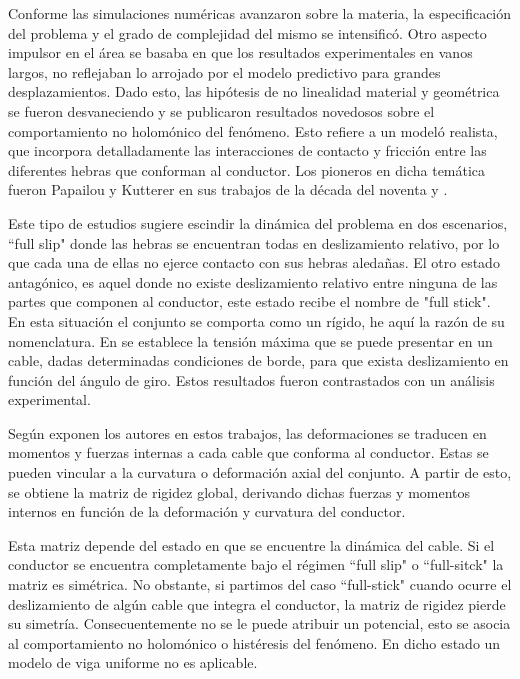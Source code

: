 Conforme las simulaciones numéricas avanzaron sobre la materia, la especificación del problema y el grado de complejidad del mismo se intensificó. Otro aspecto impulsor en el área se basaba en que los resultados experimentales en vanos largos, no reflejaban lo arrojado por el modelo predictivo para grandes desplazamientos. Dado esto, las hipótesis de no linealidad material y geométrica se fueron desvaneciendo y se publicaron resultados novedosos sobre el comportamiento no holomónico del fenómeno. Esto refiere a un modeló realista, que incorpora detalladamente las interacciones de contacto y fricción entre las diferentes hebras que conforman al conductor. Los pioneros en dicha temática fueron Papailou y Kutterer  en sus trabajos de la década del noventa \cite {Papailiou1997}  y \cite{Kutterer1992}.

Este tipo de estudios sugiere escindir la dinámica del problema en dos escenarios, ``full slip" donde las hebras se encuentran todas en deslizamiento relativo, por lo que cada una de ellas no ejerce contacto con sus hebras aledañas. El otro estado antagónico, es aquel donde no existe deslizamiento relativo entre ninguna de las partes que componen al conductor, este estado recibe el nombre de "full stick". En esta situación el conjunto se comporta como un rígido, he aquí la razón de su nomenclatura. En \cite {Papailiou1997} se establece la tensión máxima que se puede presentar en un cable, dadas determinadas condiciones de borde, para que exista deslizamiento en función del ángulo de giro. Estos resultados fueron contrastados con un análisis experimental. 


Según exponen los autores en estos trabajos, las deformaciones se traducen en momentos y fuerzas internas a cada cable que conforma al conductor. Estas se pueden vincular a la curvatura o deformación axial del conjunto. A partir de esto, se obtiene la matriz de rigidez global, derivando dichas fuerzas y momentos internos en función de la deformación y curvatura del conductor.

Esta matriz depende del estado en que se encuentre la dinámica del cable. Si el conductor se encuentra completamente bajo el régimen ``full slip" o ``full-sitck" la matriz es simétrica. No obstante, si partimos del caso ``full-stick" cuando ocurre el deslizamiento de algún cable que integra el conductor, la matriz de rigidez pierde su simetría. Consecuentemente no se le puede atribuir un potencial, esto se asocia al comportamiento no holomónico o histéresis del fenómeno. En dicho estado un modelo de viga uniforme no es aplicable.

